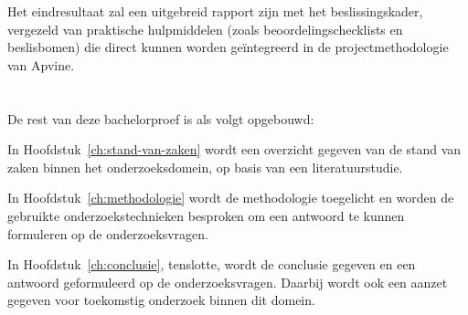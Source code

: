 Het eindresultaat zal een uitgebreid rapport zijn met het beslissingskader, vergezeld van praktische hulpmiddelen (zoals beoordelingschecklists en beslisbomen) die direct kunnen worden geïntegreerd in de projectmethodologie van Apvine.

\section{}%
\label{sec:opzet-bachelorproef}


De rest van deze bachelorproef is als volgt opgebouwd:

In Hoofdstuk~\ref{ch:stand-van-zaken} wordt een overzicht gegeven van de stand van zaken binnen het onderzoeksdomein, op basis van een literatuurstudie.

In Hoofdstuk~\ref{ch:methodologie} wordt de methodologie toegelicht en worden de gebruikte onderzoekstechnieken besproken om een antwoord te kunnen formuleren op de onderzoeksvragen.


In Hoofdstuk~\ref{ch:conclusie}, tenslotte, wordt de conclusie gegeven en een antwoord geformuleerd op de onderzoeksvragen. Daarbij wordt ook een aanzet gegeven voor toekomstig onderzoek binnen dit domein.